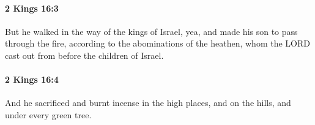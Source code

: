 		\paragraph{2 Kings 16:3} %
			\label{2KINGS-16-3}

			But he walked in the way of the kings of Israel, yea, and made his son to pass through the fire, according to the abominations of the heathen, whom the LORD cast out from before the children of Israel.


		\paragraph{2 Kings 16:4} %
			\label{2KINGS-16-4}

			And he sacrificed and burnt incense in the high places, and on the hills, and under every green tree.


